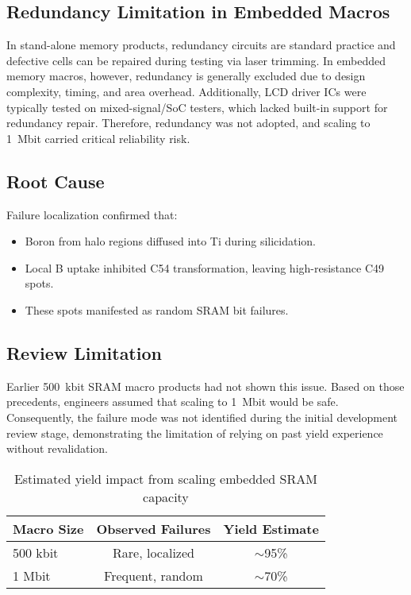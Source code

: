 \documentclass[conference]{IEEEtran}
\begin{document}
\subsection{Redundancy Limitation in Embedded Macros}
In stand-alone memory products, redundancy circuits are standard practice and defective cells can be repaired during testing via laser trimming.
In embedded memory macros, however, redundancy is generally excluded due to design complexity, timing, and area overhead.
Additionally, LCD driver ICs were typically tested on mixed-signal/SoC testers, which lacked built-in support for redundancy repair.
Therefore, redundancy was not adopted, and scaling to 1~Mbit carried critical reliability risk.

\subsection{Root Cause}
Failure localization confirmed that:
\begin{itemize}
    \item Boron from halo regions diffused into Ti during silicidation.
    \item Local B uptake inhibited C54 transformation, leaving high-resistance C49 spots.
    \item These spots manifested as random SRAM bit failures.
\end{itemize}

\subsection{Review Limitation}
Earlier 500~kbit SRAM macro products had not shown this issue. Based on those precedents, engineers assumed that scaling to 1~Mbit would be safe.
Consequently, the failure mode was not identified during the initial development review stage, demonstrating the limitation of relying on past yield experience without revalidation.

\begin{table}[!t]
\centering
\caption{Estimated yield impact from scaling embedded SRAM capacity}
\label{tab:yield_scaling}
\setlength{\tabcolsep}{4pt}
\begin{tabular}{lcc}
\toprule
Macro Size & Observed Failures & Yield Estimate \\
\midrule
500 kbit & Rare, localized & $\sim$95\% \\
1 Mbit   & Frequent, random & $\sim$70\% \\
\bottomrule
\end{tabular}
\end{table}
\end{document}
